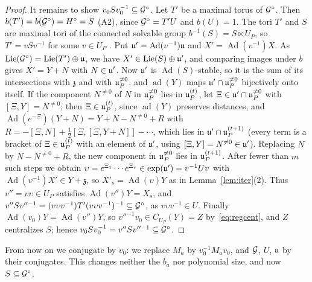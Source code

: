 \begin{proof}
It remains to show $v_0Sv_0^{-1}\subseteq\mathcal{G}^\circ$. Let $T'$ be a maximal torus of $\mathcal{G}^\circ$. Then
$b(T')=b(\mathcal{G}^\circ)=H^\circ=S$ (A2), since $\mathcal{G}^\circ=T'U$ and $b(U)=1$. The tori $T'$ and $S$ are maximal
tori of the connected solvable group $b^{-1}(S)=S\ltimes U_P$, so $T'=vSv^{-1}$ for some $v\in U_P$
\cite[10.6]{Bor91}. Put $\mathfrak{u}'=\operatorname{Ad}(v^{-1})\mathfrak{u}$ and $X'=\operatorname{Ad}(v^{-1})X$. As
$\operatorname{Lie}(\mathcal{G}^\circ)=\operatorname{Lie}(T')\oplus\mathfrak{u}$, we have $X'\in\operatorname{Lie}(S)\oplus\mathfrak{u}'$, and comparing images under $b$
gives $X'=Y+N$ with $N\in\mathfrak{u}'$. Now $\mathfrak{u}'$ is $\operatorname{Ad}(S)$-stable, so it is the sum of its intersections
with $\mathfrak z$ and with $\mathfrak{u}_P^{\ne0}$, and $\operatorname{ad}(Y)$ maps $\mathfrak{u}'\cap\mathfrak{u}_P^{\ne0}$ bijectively onto itself.
If the component $N^{\ne0}$ of $N$ in $\mathfrak{u}_P^{\ne0}$ lies in $\mathfrak{u}_P^{(t)}$, let $\Xi\in\mathfrak{u}'\cap\mathfrak{u}_P^{\ne0}$
with $[\Xi,Y]=N^{\ne0}$; then $\Xi\in\mathfrak{u}_P^{(t)}$, since $\operatorname{ad}(Y)$ preserves distances, and
$\operatorname{Ad}(e^{-\Xi})(Y+N)=Y+N-N^{\ne0}+R$ with $R=-[\Xi,N]+\frac12[\Xi,[\Xi,Y+N]]-\cdots$, which lies in
$\mathfrak{u}'\cap\mathfrak{u}_P^{(t+1)}$ (every term is a bracket of $\Xi\in\mathfrak{u}_P^{(t)}$ with an element of $\mathfrak{u}'$, using
$[\Xi,Y]=N^{\ne0}\in\mathfrak{u}'$). Replacing $N$ by $N-N^{\ne0}+R$, the new component in $\mathfrak{u}_P^{\ne0}$ lies in
$\mathfrak{u}_P^{(t+1)}$. After fewer than $m$ such steps we obtain $\upsilon=e^{\Xi_1}\cdots e^{\Xi_r}\in\exp(\mathfrak{u}')=v^{-1}Uv$ with
$\operatorname{Ad}(\upsilon^{-1})X'\in Y+\mathfrak z$, so $X'_s=\operatorname{Ad}(\upsilon)Y$ as in Lemma~\ref{lem:iter}(2). Thus
$v''=v\upsilon\in U_P$ satisfies $\operatorname{Ad}(v'')Y=X_s$, and
$v''Sv''^{-1}=(v\upsilon v^{-1})T'(v\upsilon v^{-1})^{-1}\subseteq\mathcal{G}^\circ$, as $v\upsilon v^{-1}\in U$. Finally
$\operatorname{Ad}(v_0)Y=\operatorname{Ad}(v'')Y$, so $v''^{-1}v_0\in C_{U_P}(Y)=Z$ by~\eqref{eq:regcent}, and $Z$ centralizes $S$;
hence $v_0Sv_0^{-1}=v''Sv''^{-1}\subseteq\mathcal{G}^\circ$.
\end{proof}

From now on we conjugate by $v_0$: we replace $M_a$ by $v_0^{-1}M_av_0$, and $\mathcal{G}$, $U$, $\mathfrak{u}$ by their
conjugates. This changes neither the $b_a$ nor polynomial size, and now $S\subseteq\mathcal{G}^\circ$.

